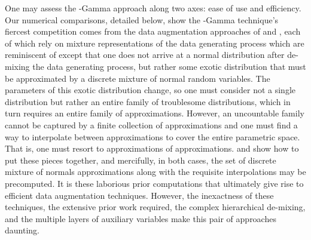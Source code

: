 One may assess the \Polya-Gamma approach along two axes: ease of use and
efficiency.  Our numerical comparisons, detailed below, show the \Polya-Gamma
technique's fiercest competition comes from the data augmentation approaches of
\cite{fussl-etal-2013} and \cite{fruhwirth-schnatter-etal-2009}, each of which
rely on mixture representations of the data generating process which are
reminiscent of \cite{albert-chib-1993} except that one does not arrive at a
normal distribution after de-mixing the data generating process, but rather some
exotic distribution that must be approximated by a discrete mixture of normal
random variables.  The parameters of this exotic distribution change, so one
must consider not a single distribution but rather an entire family of
troublesome distributions, which in turn requires an entire family of
approximations.  However, an uncountable family cannot be captured by a finite
collection of approximations and one must find a way to interpolate between
approximations to cover the entire parametric space.  That is, one must resort
to approximations of approximations.  \cite{fussl-etal-2013} and
\cite{fruhwirth-schnatter-etal-2009} show how to put these pieces together, and
mercifully, in both cases, the set of discrete mixture of normals approximations
along with the requisite interpolations may be precomputed.  It is these
laborious prior computations that ultimately give rise to efficient data
augmentation techniques.  However, the inexactness of these techniques, the
extensive prior work required, the complex hierarchical de-mixing, and the
multiple layers of auxiliary variables make this pair of approaches daunting.


